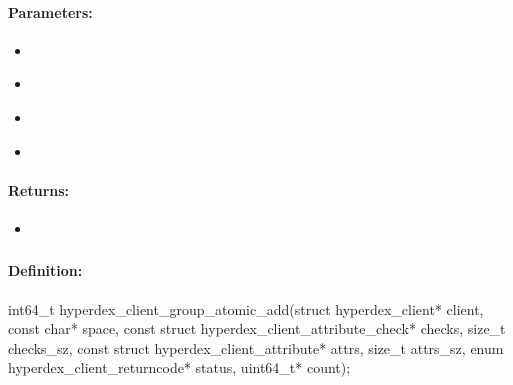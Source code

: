 \paragraph{Parameters:}
\begin{itemize}[noitemsep]
\item {}\\

\item {}\\

\item {}\\

\item {}\\

\end{itemize}

\paragraph{Returns:}
\begin{itemize}[noitemsep]
\item {}\\

\end{itemize}

\pagebreak
\subsubsection{}
\label{api:c:group_atomic_add}


\paragraph{Definition:}
\begin{ccode}
int64_t hyperdex_client_group_atomic_add(struct hyperdex_client* client,
        const char* space,
        const struct hyperdex_client_attribute_check* checks, size_t checks_sz,
        const struct hyperdex_client_attribute* attrs, size_t attrs_sz,
        enum hyperdex_client_returncode* status,
        uint64_t* count);
\end{ccode}

